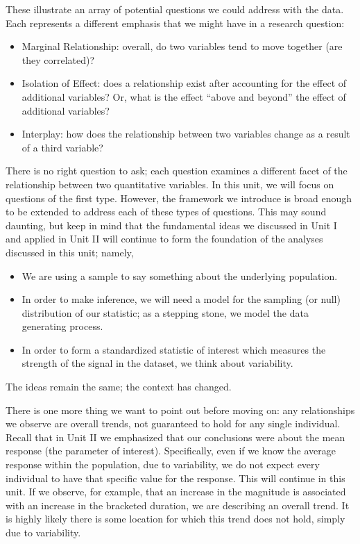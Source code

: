 \documentclass[
  letterpaper,
  DIV=11,
  numbers=noendperiod]{scrreprt}
\providecommand{\tightlist}{%
  \setlength{\itemsep}{0pt}\setlength{\parskip}{0pt}}\usepackage{longtable,booktabs,array}
\theoremstyle{plain}
\theoremstyle{definition}
\theoremstyle{definition}
\theoremstyle{remark}
\begin{document}
These illustrate an array of potential questions we could address with
the data. Each represents a different emphasis that we might have in a
research question:

\begin{itemize}
\tightlist
\item
  Marginal Relationship: overall, do two variables tend to move together
  (are they correlated)?
\item
  Isolation of Effect: does a relationship exist after accounting for
  the effect of additional variables? Or, what is the effect ``above and
  beyond'' the effect of additional variables?
\item
  Interplay: how does the relationship between two variables change as a
  result of a third variable?
\end{itemize}

There is no right question to ask; each question examines a different
facet of the relationship between two quantitative variables. In this
unit, we will focus on questions of the first type. However, the
framework we introduce is broad enough to be extended to address each of
these types of questions. This may sound daunting, but keep in mind that
the fundamental ideas we discussed in Unit I and applied in Unit II will
continue to form the foundation of the analyses discussed in this unit;
namely,

\begin{itemize}
\tightlist
\item
  We are using a sample to say something about the underlying
  population.
\item
  In order to make inference, we will need a model for the sampling (or
  null) distribution of our statistic; as a stepping stone, we model the
  data generating process.
\item
  In order to form a standardized statistic of interest which measures
  the strength of the signal in the dataset, we think about variability.
\end{itemize}

The ideas remain the same; the context has changed.

There is one more thing we want to point out before moving on: any
relationships we observe are overall trends, not guaranteed to hold for
any single individual. Recall that in Unit II we emphasized that our
conclusions were about the mean response (the parameter of interest).
Specifically, even if we know the average response within the
population, due to variability, we do not expect every individual to
have that specific value for the response. This will continue in this
unit. If we observe, for example, that an increase in the magnitude is
associated with an increase in the bracketed duration, we are describing
an overall trend. It is highly likely there is some location for which
this trend does not hold, simply due to variability.
\end{document}
